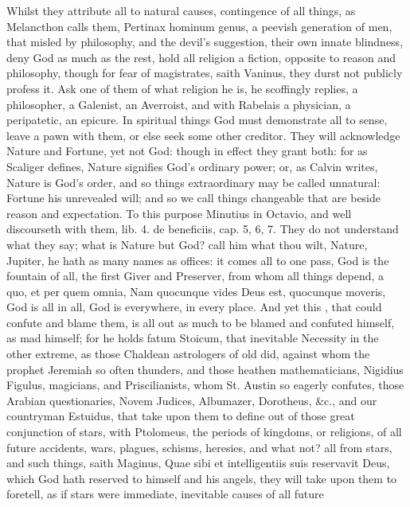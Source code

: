 {Whilst they attribute all to natural causes, contingence of all
things, as Melancthon calls them, Pertinax hominum genus, a peevish
generation of men, that misled by philosophy, and the devil's
suggestion, their own innate blindness, deny God as much as the rest,
hold all religion a fiction, opposite to reason and philosophy, though
for fear of magistrates, saith Vaninus, they durst not publicly
profess it. Ask one of them of what religion he is, he scoffingly
replies, a philosopher, a Galenist, an Averroist, and with
Rabelais a physician, a peripatetic, an epicure. In spiritual things
God must demonstrate all to sense, leave a pawn with them, or else seek
some other creditor. They will acknowledge Nature and Fortune, yet not
God: though in effect they grant both: for as Scaliger defines, Nature
signifies God's ordinary power; or, as Calvin writes, Nature is God's
order, and so things extraordinary may be called unnatural: Fortune his
unrevealed will; and so we call things changeable that are beside
reason and expectation. To this purpose Minutius in Octavio, and
 \Seneca well discourseth with them, lib. 4. de beneficiis, cap.
5, 6, 7. They do not understand what they say; what is Nature but God?
call him what thou wilt, Nature, Jupiter, he hath as many names as
offices: it comes all to one pass, God is the fountain of all, the
first Giver and Preserver, from whom all things depend, a quo, et
per quem omnia, Nam quocunque vides Deus est, quocunque moveris, God is
all in all, God is everywhere, in every place. And yet this \Seneca,
that could confute and blame them, is all out as much to be blamed and
confuted himself, as mad himself; for he holds fatum Stoicum, that
inevitable Necessity in the other extreme, as those Chaldean
astrologers of old did, against whom the prophet Jeremiah so often
thunders, and those heathen mathematicians, Nigidius Figulus,
magicians, and Priscilianists, whom St. Austin so eagerly confutes,
those Arabian questionaries, Novem Judices, Albumazer, Dorotheus, \&c.,
and our countryman Estuidus, that take upon them to define out of
those great conjunction of stars, with Ptolomeus, the periods of
kingdoms, or religions, of all future accidents, wars, plagues,
schisms, heresies, and what not? all from stars, and such things, saith
Maginus, Quae sibi et intelligentiis suis reservavit Deus, which God
hath reserved to himself and his angels, they will take upon them to
foretell, as if stars were immediate, inevitable causes of all future
}
